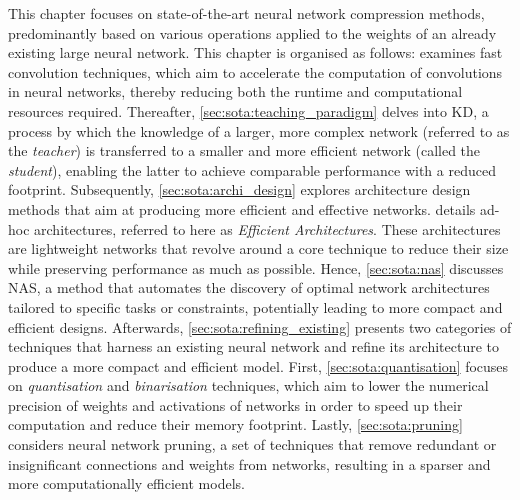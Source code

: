 This chapter focuses on state-of-the-art neural network compression methods,
predominantly based on various operations applied to the weights of an already
existing large neural network. This chapter is organised as follows:
 examines fast convolution techniques, which
aim to accelerate the computation of convolutions in neural networks, thereby
reducing both the runtime and computational resources required. Thereafter,
\cref{sec:sota:teaching_paradigm} delves into \ac{KD}, a process by which the
knowledge of a larger, more complex network (referred to as the \emph{teacher})
is transferred to a smaller and more efficient network (called the
\emph{student}), enabling the latter to achieve comparable performance with a
reduced footprint. Subsequently, \cref{sec:sota:archi_design} explores
architecture design methods that aim at producing more efficient and effective
networks.  details ad-hoc architectures, referred
to here as \emph{Efficient Architectures}. These architectures are lightweight
networks that revolve around a core technique to reduce their size while
preserving performance as much as possible. Hence, \cref{sec:sota:nas} discusses
\ac{NAS}, a method that automates the discovery of optimal network architectures
tailored to specific tasks or constraints, potentially leading to more compact
and efficient designs. Afterwards, \cref{sec:sota:refining_existing} presents
two categories of techniques that harness an existing neural network and refine
its architecture to produce a more compact and efficient model. First,
\cref{sec:sota:quantisation} focuses on \emph{quantisation} and
\emph{binarisation} techniques, which aim to lower the numerical precision of
weights and activations of networks in order to speed up their computation and
reduce their memory footprint. Lastly, \cref{sec:sota:pruning} considers neural
network pruning, a set of techniques that remove redundant or insignificant
connections and weights from networks, resulting in a sparser and more
computationally efficient models.\\





